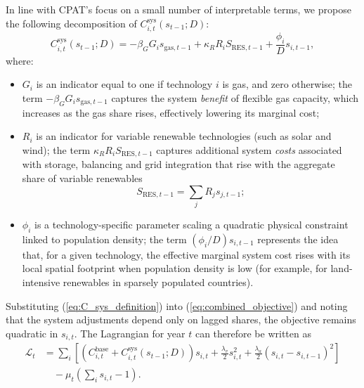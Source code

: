 \documentclass[preprint,authoryear,12pt]{elsarticle}
\begin{document}
In line with CPAT’s focus on a small number of interpretable terms, we propose the following
decomposition of $C_{i,t}^{\text{sys}}(s_{t-1};D)$:
\begin{equation}
    C_{i,t}^{\text{sys}}(s_{t-1};D)
    = - \beta_G G_i s_{\text{gas},t-1}
      + \kappa_R R_i S_{\text{RES},t-1}
      + \frac{\phi_i}{D} s_{i,t-1},
    \label{eq:C_sys_definition}
\end{equation}
where:
\begin{itemize}
    \item $G_i$ is an indicator equal to one if technology $i$ is gas, and zero otherwise; the term
          $-\beta_G G_i s_{\text{gas},t-1}$ captures the system \emph{benefit} of flexible gas
          capacity, which increases as the gas share rises, effectively lowering its marginal cost;
    \item $R_i$ is an indicator for variable renewable technologies (such as solar and wind); the
          term $\kappa_R R_i S_{\text{RES},t-1}$ captures additional system \emph{costs} associated
          with storage, balancing and grid integration that rise with the aggregate share of
          variable renewables
          \[
              S_{\text{RES},t-1} = \sum_j R_j s_{j,t-1};
          \]
    \item $\phi_i$ is a technology-specific parameter scaling a quadratic physical constraint
          linked to population density; the term $(\phi_i / D) s_{i,t-1}$ represents the idea that,
          for a given technology, the effective marginal system cost rises with its local spatial
          footprint when population density is low (for example, for land-intensive renewables in
          sparsely populated countries).
\end{itemize}

Substituting (\ref{eq:C_sys_definition}) into (\ref{eq:combined_objective}) and noting that the
system adjustments depend only on lagged shares, the objective remains quadratic in $s_{i,t}$. The
Lagrangian for year $t$ can therefore be written as
\begin{align}
    \mathcal{L}_t
    &= \sum_i \left[
        \left( C_{i,t}^{\text{base}} + C_{i,t}^{\text{sys}}(s_{t-1};D) \right) s_{i,t}
      + \frac{\lambda_v}{2} s_{i,t}^2
      + \frac{\lambda_a}{2}(s_{i,t} - s_{i,t-1})^2
    \right]
    \nonumber\\
    &\quad - \mu_t \left( \sum_i s_{i,t} - 1 \right).
\end{align}
\end{document}

